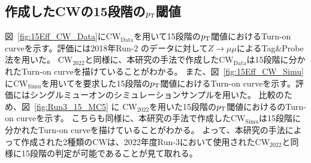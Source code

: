 \subsection{作成したCWの15段階の$p_{\rm{T}}$閾値}
図~\ref{fig:15Eff_CW_Data}に$\mathrm{CW_{Data}}$を用いて15段階の$p_{\rm{T}}$閾値におけるTurn-on curveを示す。評価には2018年Run-2 のデータに対して$Z\rightarrow \mu\mu$によるTag$\&$Probe法を用いた。
$\mathrm{CW_{2022}}$と同様に、本研究の手法で作成した$\mathrm{CW_{Data}}$は15段階に分かれたTurn-on curveを描けていることがわかる。
また、図~\ref{fig:15Eff_CW_Simu}に$\mathrm{CW_{Simu}}$を用いてを要求した15段階の$p_{\rm{T}}$閾値におけるTurn-on curveを示す。評価にはシングルミューオンのシミュレーションサンプルを用いた。
比較のため、図~\ref{fig:Run3_15_MC5} に $\mathrm{CW_{2022}}$を用いた15段階の$p_{\rm{T}}$閾値におけるのTurn-on curveを示す。
こちらも同様に、本研究の手法で作成した$\mathrm{CW_{Simu}}$は15段階に分かれたTurn-on curveを描けていることがわかる。
よって、本研究の手法によって作成された2種類のCWは、2022年度Run-3において使用された$\mathrm{CW_{2022}}$と同様に15段階の判定が可能であることが見て取れる。

